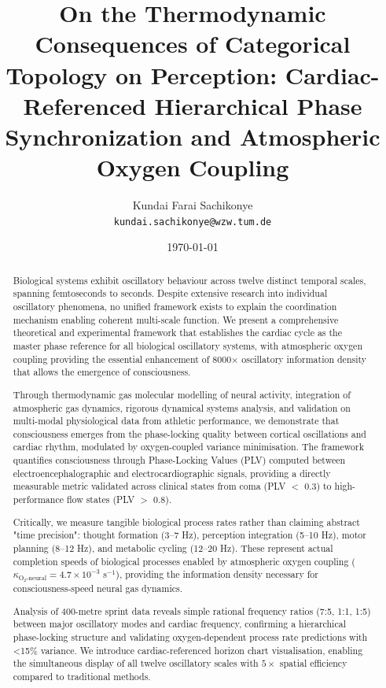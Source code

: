 \documentclass[12pt]{article}
\title{\textbf{On the Thermodynamic Consequences of Categorical Topology on Perception: Cardiac-Referenced Hierarchical Phase Synchronization and Atmospheric Oxygen Coupling }}
\author{
Kundai Farai Sachikonye\\
\texttt{kundai.sachikonye@wzw.tum.de}
}
\date{\today}
\theoremstyle{remark}
\begin{document}
\maketitle

\begin{abstract}
Biological systems exhibit oscillatory behaviour across twelve distinct temporal scales, spanning femtoseconds to seconds. Despite extensive research into individual oscillatory phenomena, no unified framework exists to explain the coordination mechanism enabling coherent multi-scale function. We present a comprehensive theoretical and experimental framework that establishes the cardiac cycle as the master phase reference for all biological oscillatory systems, with atmospheric oxygen coupling providing the essential enhancement of 8000× oscillatory information density that allows the emergence of consciousness.

Through thermodynamic gas molecular modelling of neural activity, integration of atmospheric gas dynamics, rigorous dynamical systems analysis, and validation on multi-modal physiological data from athletic performance, we demonstrate that consciousness emerges from the phase-locking quality between cortical oscillations and cardiac rhythm, modulated by oxygen-coupled variance minimisation. The framework quantifies consciousness through Phase-Locking Values (PLV) computed between electroencephalographic and electrocardiographic signals, providing a directly measurable metric validated across clinical states from coma (PLV $<$ 0.3) to high-performance flow states (PLV $>$ 0.8).

Critically, we measure tangible biological process rates rather than claiming abstract "time precision": thought formation (3--7 Hz), perception integration (5--10 Hz), motor planning (8--12 Hz), and metabolic cycling (12--20 Hz). These represent actual completion speeds of biological processes enabled by atmospheric oxygen coupling ($\kappa_{\text{O}_2\text{-neural}} = 4.7 \times 10^{-3}$ s$^{-1}$), providing the information density necessary for consciousness-speed neural gas dynamics.

Analysis of 400-metre sprint data reveals simple rational frequency ratios (7:5, 1:1, 1:5) between major oscillatory modes and cardiac frequency, confirming a hierarchical phase-locking structure and validating oxygen-dependent process rate predictions with <15\% variance. We introduce cardiac-referenced horizon chart visualisation, enabling the simultaneous display of all twelve oscillatory scales with $5\times$ spatial efficiency compared to traditional methods.


\end{abstract}
\end{document}
